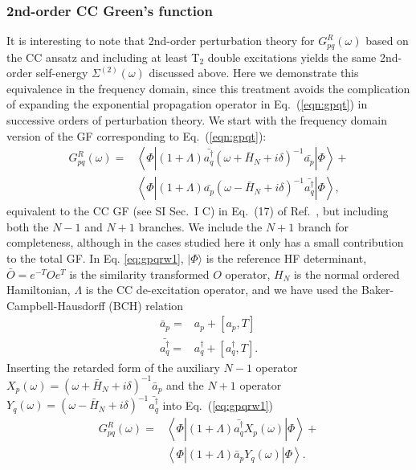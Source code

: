 \documentclass[aps,prb,twocolumn,groupaddress,floatfix]{revtex4}
\begin{document}
\subsubsection{2nd-order CC Green's function}
\label{sec:ccg_t_pt}

It is interesting to note that 2nd-order perturbation theory
for $G^R_{pq}(\omega)$ based on the CC ansatz and
including at least T$_2$ double excitations yields the same 2nd-order
self-energy $\Sigma^{(2)}(\omega)$ discussed above.
Here we demonstrate this equivalence in the
frequency domain, since this treatment avoids
the complication of expanding the exponential propagation operator
in Eq.\ (\ref{eqn:gpqt}) in successive orders of perturbation theory.
We start with the frequency domain version of the GF corresponding to Eq.\ (\ref{eqn:gpqt}):
\begin{equation}
\label{eq:gpqrw1}
\begin{split}
G^R_{pq} (\omega) =&
\left\langle \Phi \left| (1+\Lambda) \bar{a^{\dagger}_q}
(\omega + \bar{H}_N + i\delta)^{-1} \bar{a_p} \right| \Phi \right\rangle +\\
&\left\langle \Phi \left| (1+\Lambda) \bar{a_p}
(\omega - \bar{H}_N + i\delta)^{-1} \bar{a^{\dagger}_q} \right| \Phi \right\rangle,
\end{split}
\end{equation}
equivalent to the CC GF (see SI Sec.\ I C) in Eq.\ (17) of
Ref.\ , but including both the $N-1$ and $N+1$ branches. We include the $N+1$ branch for completeness, although in the cases studied here it only has a small contribution to the total GF.
In Eq. \ref{eq:gpqrw1}, $|\Phi \rangle$ is the reference HF determinant, $\bar{O} = e^{-T}Oe^{T}$ is the similarity transformed $O$
operator, $H_N$ is the normal ordered Hamiltonian,
$\Lambda$ is the CC de-excitation operator, and we have used the
Baker-Campbell-Hausdorff (BCH) relation 
\begin{equation}
\label{eq:apbar}
\begin{split}
\bar{a}_p =&  a_p + [a_p,T] \\
\bar{a^{\dagger}_q} =& a^{\dagger}_q + [a^{\dagger}_q,T].
\end{split}
\end{equation}
Inserting the retarded form of the auxiliary $N-1$ operator $X_{p}(\omega) = (\omega+\bar{H}_N+i\delta)^{-1} \bar{a}_p$ 
and the $N+1$ operator $Y_{q}(\omega) = (\omega-\bar{H}_N+i\delta)^{-1} \bar{a^{\dagger}_q}$
into Eq.\ (\ref{eq:gpqrw1})
\begin{equation}
\label{eq:gpqrw2}
\begin{split}
G^R_{pq} (\omega) =&
\left< \Phi \left| (1+\Lambda) \bar{a^{\dagger}_q}
X_{p}(\omega) \right| \Phi \right> +\\
&\left< \Phi \left| (1+\Lambda) \bar{a}_p
Y_{q}(\omega) \right| \Phi \right>.
\end{split}
\end{equation}
\end{document}
